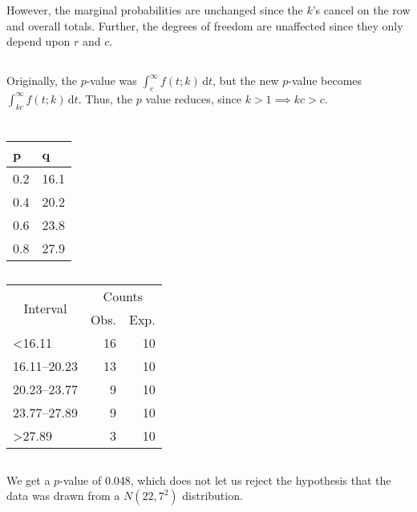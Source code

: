 \documentclass[twocolumn]{article}
\newcommand{\setsection}[1]{\setcounter{section}{#1}\addtocounter{section}{-1}\section{}}
\newcommand{\intg}[4]{\int_{#1}^{#2} \! #3 \, \mathrm{d}#4}
\begin{document}
However, the marginal probabilities are unchanged since the $k$'s cancel on the row and overall totals. Further, the degrees of freedom are unaffected since they only depend upon $r$ and $c$.

\subsection{}

Originally, the $p$-value was $\intg{c}{\infty}{f(t;k)}{t}$, but the new $p$-value becomes $\intg{kc}{\infty}{f(t;k)}{t}$. Thus, the $p$ value reduces, since $k>1\implies kc>c$.

\setsection{22}

\subsection{}

\begin{table}[!ht]
\centering
\begin{tabular}{@{}ll@{}}
\toprule
p   & q    \\ \midrule
0.2 & 16.1 \\
0.4 & 20.2 \\
0.6 & 23.8 \\
0.8 & 27.9 \\ \bottomrule
\end{tabular}
\end{table}

\newpage

\subsection{}
\begin{table}[!ht]
\centering
\begin{tabular}{@{}lrr@{}}
\toprule
\multicolumn{1}{c}{\multirow{2}{*}{Interval}} & \multicolumn{2}{c}{Counts}                          \\ \cmidrule(l){2-3} 
                                              & \multicolumn{1}{l}{Obs.} & \multicolumn{1}{l}{Exp.} \\ \midrule
\textless16.11                                & 16                       & 10                       \\
16.11--20.23                                  & 13                       & 10                       \\
20.23--23.77                                  & 9                        & 10                       \\
23.77--27.89                                  & 9                        & 10                       \\
\textgreater27.89                             & 3                        & 10                       \\ \bottomrule
\end{tabular}
\end{table}

\subsection{}

We get a $p$-value of 0.048, which does not let us reject the hypothesis that the data was drawn from a $N(22,7^2)$ distribution.

\setsection{25}



\setsection{29}
\end{document}
